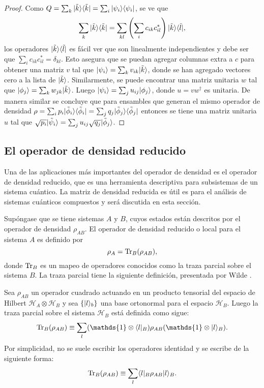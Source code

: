 \begin{proof}
Como  $Q=\sum_k  |\tilde{k}\rangle \langle \tilde{k}|=\sum_{i}|\psi_i\rangle \langle\psi_i|$, se ve
que \[\sum_k |\tilde{k}\rangle \langle \tilde{k}|=\sum_{kl} \left(\sum_i
c_{ik}c_{il}^{*}\right)|\tilde{k}\rangle \langle \tilde{l}|,\] los operadores $|\tilde{k}
\rangle \langle \tilde{l}|$ es fácil ver  que son linealmente independientes y debe ser
que $\sum_i c_{ik}c_{il}^{*}=\delta_{kl}$. Esto asegura que se puedan agregar
columnas extra a $c$ para obtener una matriz $v$ tal que
$|\psi_i\rangle=\sum_{k}v_{ik}|\tilde{k}\rangle  $, donde se han agregado  vectores cero a la
lista de $|\tilde{k}\rangle$. Similarmente, se puede encontrar una matriz unitaria
$w$ tal que $|\phi_j\rangle=\sum_{k}w_{jk}|\tilde{k}\rangle$. Luego $|\psi_i\rangle=\sum_j
u_{ij}|\phi_j\rangle$, donde  $u=vw^\dagger$ es unitaria. De manera similar se concluye que para ensambles que generan el mismo operador de densidad $\rho=\sum_i p_i |\tilde{\phi}_i\rangle \langle\tilde{\phi}_i|= \sum_j q_j|\tilde{\phi}_j \rangle \langle\tilde{\phi}_j| $ entonces se tiene una matriz unitaria $u$ tal que  $\sqrt{p_i}|\tilde{\psi}_i\rangle=\sum_{j} u_{ij} \sqrt{q_j}|\tilde{\phi}_j\rangle$.
\end{proof}

\subsection{El operador de densidad reducido} %

Una de las aplicaciones más importantes del operador de densidad es el operador
de densidad reducido, que es una herramienta descriptiva para subsistemas de un
sistema cuántico. La matriz de densidad reducida es útil es
para el análisis de sistemas cuánticos compuestos y será discutida
en esta sección.


Supóngase que se tiene sistemas $A$ y $B$, cuyos estados están descritos por el
operador de densidad $\rho_{AB}$. El operador de densidad reducido o local para
el sistema $A$ es definido por  
\begin{equation}
	\rho_A={\rm Tr}_B(\rho_{AB}),
\end{equation} 
donde ${\rm Tr}_B$ es un mapeo de operadores conocidos como la traza parcial sobre
el sistema $B$. La traza parcial tiene la siguiente definición, presentada
por Wilde {\cite{wilde2011classical}}.

\begin{definition}
Sea  $ \rho_{AB}$ un operador cuadrado actuando en un producto tensorial del
espacio de Hilbert $\mathcal{H}_A \otimes \mathcal{ H}_B$ y sea $\{|l\rangle_b\}$
una base ortonormal para el espacio $\mathcal{H}_B$. Luego la traza parcial
sobre el sistema $\mathcal{H}_B$ está definida como sigue: 
\begin{equation}
		\tr_B(\rho_{AB})\equiv\sum_{l} (\mathds{1}\otimes\la l|_B)\rho_{AB}(\mathds{1}\otimes|l\ra_B).	
\end{equation} 
Por simplicidad, no se suele escribir los operadores identidad y se escribe de la siguiente forma:
\begin{equation}
	{\rm Tr}_B(\rho_{AB})\equiv\sum_{l} \langle l|_B\rho_{AB}|l\rangle_B.
\end{equation}
\end{definition}

